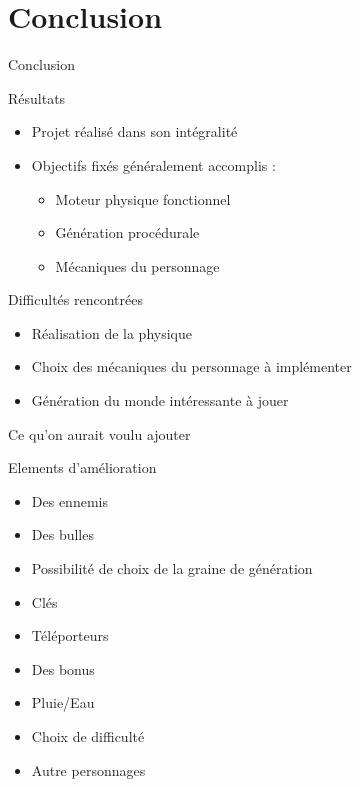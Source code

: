 \documentclass{beamer}
\begin{document}
{\section{Conclusion}
\begin{frame}{Conclusion}
    \begin{block}{R\'esultats}
        \begin{itemize}
            \item[\bullet] Projet réalisé dans son intégralité
            \item[\bullet] Objectifs fixés généralement accomplis :
            \begin{itemize}
                \item[\rightarrow] Moteur physique fonctionnel
                \item[\rightarrow] Génération procédurale
                \item[\rightarrow] Mécaniques du personnage
            \end{itemize}
        \end{itemize}
    \end{block}
    \begin{block}{Difficultés rencontrées}
        \begin{itemize}
            \item[\bullet] Réalisation de la physique
            \item[\bullet] Choix des mécaniques du personnage à implémenter
            \item[\bullet] Génération du monde intéressante à jouer
        \end{itemize}
    \end{block}
\end{frame}

\begin{frame}{Ce qu'on aurait voulu ajouter}
    \begin{block}{Elements d'amélioration}
        \begin{itemize}
          \item[\bullet] Des ennemis
          \item[\bullet] Des bulles
          \item[\bullet] Possibilité de choix de la graine de génération
                  \item[\bullet] Clés
          \item[\bullet] Téléporteurs
          \item[\bullet] Des bonus
          \item[\bullet] Pluie/Eau
          \item[\bullet] Choix de difficulté
          \item[\bullet] Autre personnages
        \end{itemize}
    \end{block}
\end{frame}

}
\end{document}
